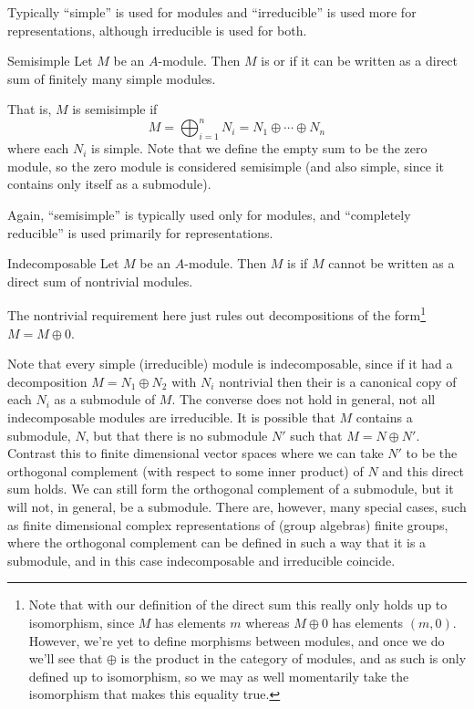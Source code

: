 Typically \enquote{simple} is used for modules and \enquote{irreducible} is used more for representations, although irreducible is used for both.

\begin{dfn}{Semisimple}{}
    Let \(M\) be an \(A\)-module.
    Then \(M\) is  or  if it can be written as a direct sum of finitely many simple modules.
\end{dfn}

That is, \(M\) is semisimple if 
\begin{equation}
    M = \bigoplus_{i=1}^n N_i = N_1 \oplus \dotsb \oplus N_n
\end{equation}
where each \(N_i\) is simple.
Note that we define the empty sum to be the zero module, so the zero module is considered semisimple (and also simple, since it contains only itself as a submodule).

Again, \enquote{semisimple} is typically used only for modules, and \enquote{completely reducible} is used primarily for representations.

\begin{dfn}{Indecomposable}{}
    Let \(M\) be an \(A\)-module.
    Then \(M\) is  if \(M\) cannot be written as a direct sum of nontrivial modules.
\end{dfn}

The nontrivial requirement here just rules out decompositions of the form\footnote{Note that with our definition of the direct sum this really only holds up to isomorphism, since \(M\) has elements \(m\) whereas \(M \oplus 0\) has elements \((m, 0)\). However, we're yet to define morphisms between modules, and once we do we'll see that \(\oplus\) is the product in the category of modules, and as such is only defined up to isomorphism, so we may as well momentarily take the isomorphism that makes this equality true.} \(M = M \oplus 0\).

Note that every simple (irreducible) module is indecomposable, since if it had a decomposition \(M = N_1 \oplus N_2\) with \(N_i\) nontrivial then their is a canonical copy of each \(N_i\) as a submodule of \(M\).
The converse does not hold in general, not all indecomposable modules are irreducible.
It is possible that \(M\) contains a submodule, \(N\), but that there is no submodule \(N'\) such that \(M = N \oplus N'\).
Contrast this to finite dimensional vector spaces where we can take \(N'\) to be the orthogonal complement (with respect to some inner product) of \(N\) and this direct sum holds.
We can still form the orthogonal complement of a submodule, but it will not, in general, be a submodule.
There are, however, many special cases, such as finite dimensional complex representations of (group algebras) finite groups, where the orthogonal complement can be defined in such a way that it is a submodule, and in this case indecomposable and irreducible coincide.

